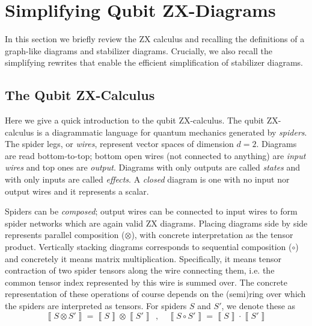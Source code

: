 \section{Simplifying Qubit ZX-Diagrams}

In this section we briefly review the ZX calculus
and recalling the definitions of a graph-like diagrams and stabilizer diagrams.
Crucially, we also recall the simplifying rewrites that enable the efficient
simplification of stabilizer diagrams.

\subsection{The Qubit ZX-Calculus}

Here we give a quick introduction to the qubit ZX-calculus.
The qubit ZX-calculus is a diagrammatic language for quantum mechanics generated by \emph{spiders}.
The spider legs, or \emph{wires}, represent vector spaces of dimension $d=2$.
Diagrams are read bottom-to-top; bottom open wires (not connected to anything) are \emph{input wires} and top ones are \emph{output}.
Diagrams with only outputs are called \emph{states} and with only inputs are called \emph{effects}.
A \emph{closed} diagram is one with no input nor output wires
and it represents a scalar.

Spiders can be \emph{composed};
output wires can be connected to input wires
to form spider networks which are again valid ZX diagrams.
Placing diagrams side by side represents parallel composition ($\otimes$),
with concrete interpretation as the tensor product.
Vertically stacking diagrams corresponds to sequential composition ($\circ$) and concretely it means matrix multiplication.
Specifically, it means tensor contraction of two spider tensors along the wire connecting them, i.e. the common tensor index represented by this wire is summed over.
The concrete representation of these operations of course depends on the (semi)ring over which the spiders are interpreted as tensors.
For spiders $S$ and $S'$, we denote these as
\begin{equation}
\left\llbracket S \otimes S' \right\rrbracket = \left\llbracket S \right\rrbracket \otimes \left\llbracket S' \right\rrbracket ~~,\quad
	\left\llbracket S \circ S' \right\rrbracket = \left\llbracket S \right\rrbracket \cdot \left\llbracket S' \right\rrbracket 
\end{equation} 


